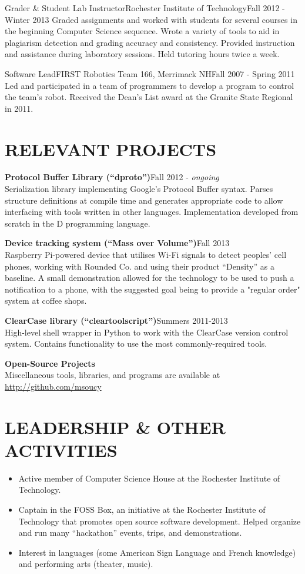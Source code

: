 \documentclass[line]{res}
\newcommand{\project}[2]{{\bf #1}\hfill #2\\}
\def\ongoing{\textit{ongoing}}
\begin{document}
\begin{resume}
	\begin{job}{Grader \& Student Lab Instructor}{Rochester Institute of Technology}{Fall 2012 - Winter 2013}
		Graded assignments and worked with students for several courses in the beginning Computer Science sequence.
		Wrote a variety of tools to aid in plagiarism detection and grading accuracy and consistency.
		Provided instruction and assistance during laboratory sessions.
		Held tutoring hours twice a week.
	\end{job}

	\begin{job}{Software Lead}{FIRST Robotics Team 166, Merrimack NH}{Fall 2007 - Spring 2011}
		Led and participated in a team of programmers to develop a program to control the team's robot.
		Received the Dean's List award at the Granite State Regional in 2011.
	\end{job}

\section{RELEVANT PROJECTS}

	\project{Protocol Buffer Library (``dproto'')}{Fall 2012 - \ongoing}
	Serialization library implementing Google's Protocol Buffer syntax.
	Parses structure definitions at compile time and generates appropriate code to allow interfacing with tools written in other languages.
	Implementation developed from scratch in the D programming language.

	\project{Device tracking system (``Mass over Volume'')}{Fall 2013}
	Raspberry Pi-powered device that utilises Wi-Fi signals to detect peoples' cell phones, working with Rounded Co. and using their product ``Density'' as a baseline.
	A small demonstration allowed for the technology to be used to push a notification to a phone, with the suggested goal being to provide a "regular order" system at coffee shops.

	\project{ClearCase library (``cleartoolscript'')}{Summers 2011-2013}
	High-level shell wrapper in Python to work with the ClearCase version control system.
	Contains functionality to use the most commonly-required tools.

	\project{Open-Source Projects}{}
	Miscellaneous tools, libraries, and programs are available at \url{http://github.com/msoucy}

\section{LEADERSHIP \& OTHER ACTIVITIES}
	\begin{itemize}[leftmargin=10pt]
	\item Active member of Computer Science House at the Rochester Institute of Technology.
	\item Captain in the FOSS Box, an initiative at the Rochester Institute of Technology that promotes open source software development.
          Helped organize and run many ``hackathon'' events, trips, and demonstrations.
	\item Interest in languages (some American Sign Language and French knowledge) and performing arts (theater, music).
	\end{itemize}


\end{resume}
\end{document}
